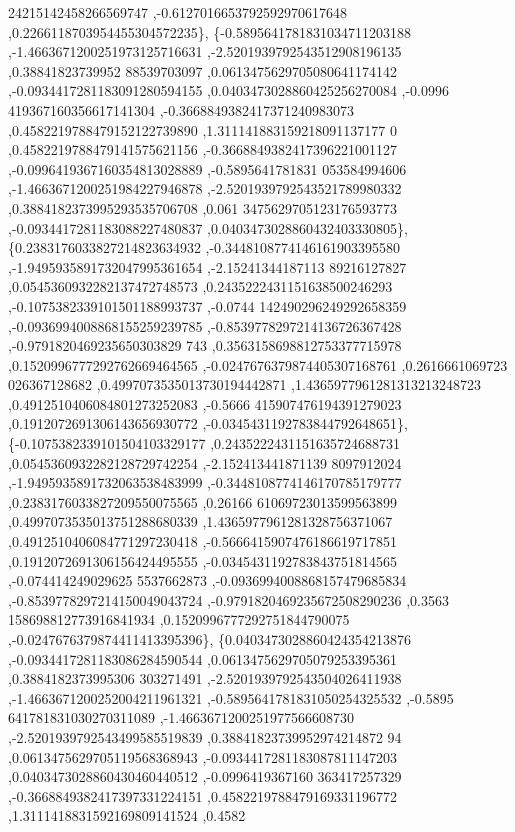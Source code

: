 \begin{DoxyCode}
      24215142458266569747 ,-0.6127016653792592970617648 ,0.2266118703954455304572235\},
\{-0.5895641781831034711203188 ,-1.4663671200251973125716631 ,-2.5201939792543512908196135 ,0.38841823739952
      88539703097 ,0.0613475629705080641174142 ,-0.0934417281183091280594155 ,0.0403473028860425256270084 ,-0.0996
      419367160356617141304 ,-0.3668849382417371240983073 ,0.4582219788479152122739890 ,1.311141883159218091137177
      0 ,0.4582219788479141575621156 ,-0.3668849382417396221001127 ,-0.0996419367160354813028889 ,-0.5895641781831
      053584994606 ,-1.4663671200251984227946878 ,-2.5201939792543521789980332 ,0.3884182373995293535706708 ,0.061
      3475629705123176593773 ,-0.0934417281183088227480837 ,0.0403473028860432403330805\},
\{0.2383176033827214823634932 ,-0.3448108774146161903395580 ,-1.9495935891732047995361654 ,-2.15241344187113
      89216127827 ,0.0545360932282137472748573 ,0.2435222431151638500246293 ,-0.1075382339101501188993737 ,-0.0744
      142490296249292658359 ,-0.0936994008868155259239785 ,-0.8539778297214136726367428 ,-0.9791820469235650303829
      743 ,0.3563158698812753377715978 ,0.1520996777292762669464565 ,-0.0247676379874405307168761 ,0.2616661069723
      026367128682 ,0.4997073535013730194442871 ,1.4365977961281313213248723 ,0.4912510406084801273252083 ,-0.5666
      415907476194391279023 ,0.1912072691306143656930772 ,-0.0345431192783844792648651\},
\{-0.1075382339101504103329177 ,0.2435222431151635724688731 ,0.0545360932282128729742254 ,-2.152413441871139
      8097912024 ,-1.9495935891732063538483999 ,-0.3448108774146170785179777 ,0.2383176033827209550075565 ,0.26166
      61069723013599563899 ,0.4997073535013751288680339 ,1.4365977961281328756371067 ,0.4912510406084771297230418 
      ,-0.5666415907476186619717851 ,0.1912072691306156424495555 ,-0.0345431192783843751814565 ,-0.074414249029625
      5537662873 ,-0.0936994008868157479685834 ,-0.8539778297214150049043724 ,-0.9791820469235672508290236 ,0.3563
      158698812773916841934 ,0.1520996777292751844790075 ,-0.0247676379874411413395396\},
\{0.0403473028860424354213876 ,-0.0934417281183086284590544 ,0.0613475629705079253395361 ,0.3884182373995306
      303271491 ,-2.5201939792543504026411938 ,-1.4663671200252004211961321 ,-0.5895641781831050254325532 ,-0.5895
      641781831030270311089 ,-1.4663671200251977566608730 ,-2.5201939792543499585519839 ,0.38841823739952974214872
      94 ,0.0613475629705119568368943 ,-0.0934417281183087811147203 ,0.0403473028860430460440512 ,-0.0996419367160
      363417257329 ,-0.3668849382417397331224151 ,0.4582219788479169331196772 ,1.3111418831592169809141524 ,0.4582

\end{DoxyCode}
